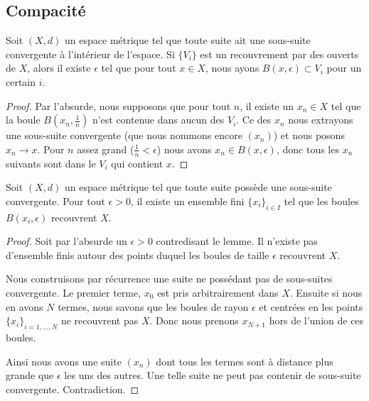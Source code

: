 \subsection{Compacité}

\begin{lemma}    \label{LemQFXOWyx}
    Soit \( (X,d)\) un espace métrique tel que toute suite ait une sous-suite convergente à l'intérieur de l'espace. Si \( \{ V_i \}\) est un recouvrement par des ouverts de \( X\), alors il existe \( \epsilon\) tel que pour tout \( x\in X\), nous ayons \( B(x,\epsilon)\subset V_i\) pour un certain \( i\).
\end{lemma}

\begin{proof}
    Par l'absurde, nous supposons que pour tout \( n\), il existe un \( x_n\in X\) tel que la boule \( B(x_n,\frac{1}{ n })\) n'est contenue dans aucun des \( V_i\). Ce des \( x_n\) nous extrayons une sous-suite convergente (que nous nommons encore \( (x_n)\)) et nous posons \( x_n\to x\). Pour \( n\) assez grand (\( \frac{1}{ n }<\epsilon\)) nous avons \( x_n\in B(x,\epsilon)\), donc tous les \( x_n\) suivants sont dans le \( V_i\) qui contient \( x\).
\end{proof}

\begin{lemma}   \label{LemMGQqgDG}
    Soit \( (X,d)\) un espace métrique tel que toute suite possède une sous-suite convergente. Pour tout \( \epsilon>0\), il existe un ensemble fini \( \{ x_i \}_{i\in I}\) tel que les boules \( B(x_i,\epsilon)\) recouvrent \( X\).
\end{lemma}

\begin{proof}
    Soit par l'absurde un \( \epsilon>0\) contredisant le lemme. Il n'existe pas d'ensemble finis autour des points duquel les boules de taille \( \epsilon\) recouvrent \( X\).

    Nous construisons par récurrence une suite ne possédant pas de sous-suites convergente. Le premier terme, \( x_0\) est pris arbitrairement dans \( X\). Ensuite si nous en avons \( N\) termes, nous savons que les boules de rayon \( \epsilon\) et centrées en les points \( \{ x_i \}_{i=1,\ldots, N}\) ne recouvrent pas \( X\). Donc nous prenons \( x_{N+1}\) hors de l'union de ces boules.

    Ainsi nous avons une suite \( (x_n)\) dont tous les termes sont à distance plus grande que \( \epsilon\) les uns des autres. Une telle suite ne peut pas contenir de sous-suite convergente. Contradiction.
\end{proof}

